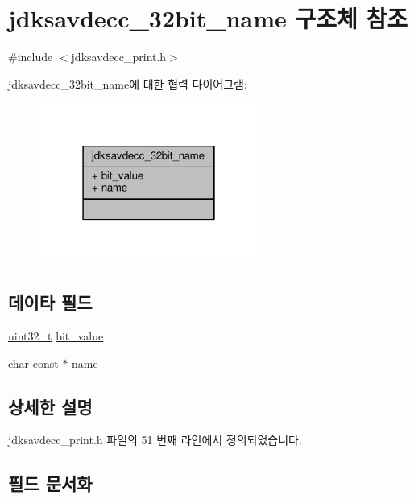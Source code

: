 \hypertarget{structjdksavdecc__32bit__name}{}\section{jdksavdecc\+\_\+32bit\+\_\+name 구조체 참조}
\label{structjdksavdecc__32bit__name}


{\ttfamily \#include $<$jdksavdecc\+\_\+print.\+h$>$}



jdksavdecc\+\_\+32bit\+\_\+name에 대한 협력 다이어그램\+:
\nopagebreak
\begin{figure}[H]
\begin{center}
\leavevmode
\includegraphics[width=202pt]{structjdksavdecc__32bit__name__coll__graph}
\end{center}
\end{figure}
\subsection*{데이타 필드}
\begin{DoxyCompactItemize}
\item 
\hyperlink{parse_8c_a6eb1e68cc391dd753bc8ce896dbb8315}{uint32\+\_\+t} \hyperlink{structjdksavdecc__32bit__name_ae9a111dd43e7e9ba42244f521baa5e77}{bit\+\_\+value}
\item 
char const $\ast$ \hyperlink{structjdksavdecc__32bit__name_a5f1de76dd5d451949e12c0fbc966ca70}{name}
\end{DoxyCompactItemize}


\subsection{상세한 설명}


jdksavdecc\+\_\+print.\+h 파일의 51 번째 라인에서 정의되었습니다.



\subsection{필드 문서화}
